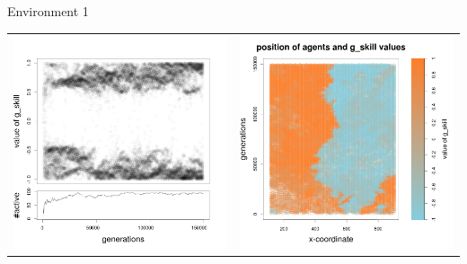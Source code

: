 \documentclass[8pt, handout=show,notes=show]{beamer}
\begin{document}
\begin{frame}{Environment 1}
\begin{table}[H]
\centering
\begin{tabular}{cc}
\includegraphics[width=\imgSize]{../images/5StaticEnv/Gplot47_staticEnv1}&\includegraphics[width=\imgSize]{../images/5StaticEnv/Gplot47Static_staticEnv1}\\

\end{tabular}
\end{table}
\end{frame}
\end{document}
